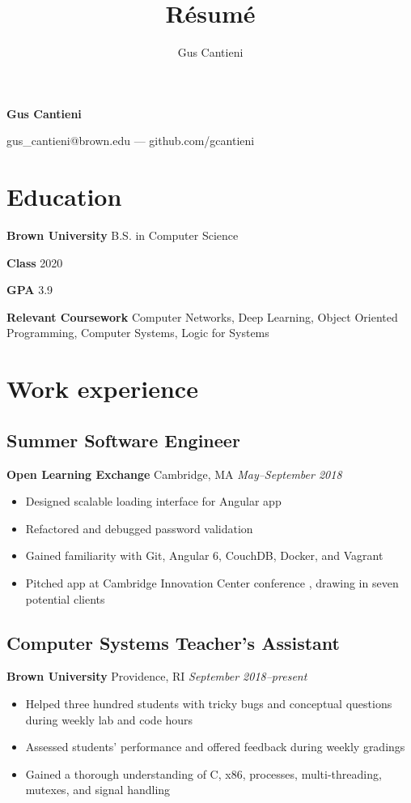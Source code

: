 \documentclass[11pt]{article}
\title{R\'esum\'e}
\author{Gus Cantieni}
\makeatletter
\renewcommand{\maketitle}{
	\begin{center}
		{\huge\bfseries Gus Cantieni}
		\vspace{0.25em}

		gus\_cantieni@brown.edu --- github.com/gcantieni

	\end{center}
}
\makeatother
\begin{document}
\maketitle
\section{Education}
\begin{minipage}{20em}
	\textbf{Brown University} B.S. in Computer Science

	\textbf{Class} 2020

	\textbf{GPA} 3.9

\end{minipage}
\begin{minipage}{25em}

	\textbf{Relevant Coursework} Computer Networks, Deep Learning, Object Oriented Programming, Computer Systems, Logic for Systems
\end{minipage}

\section{Work experience} 
\subsection{Summer Software Engineer} 
\textbf{Open Learning Exchange} Cambridge, MA \hfill \textit{May--September 2018}
\begin{itemize}
	\item Designed scalable loading interface for Angular app 
	\item Refactored and debugged password validation 
	\item Gained familiarity with Git, Angular 6, CouchDB, Docker, and Vagrant
	\item Pitched app at Cambridge Innovation Center conference , drawing in seven potential clients
\end{itemize}


\subsection{Computer Systems Teacher's Assistant}
\textbf{Brown University} Providence, RI \hfill \textit{September 2018--present}

\begin{itemize}
	\item Helped three hundred students with tricky bugs and conceptual questions during weekly lab and code hours
	\item Assessed students' performance and offered feedback during weekly gradings
	\item Gained a thorough understanding of C, x86, processes, multi-threading, mutexes, and signal handling
\end{itemize}
\end{document}
